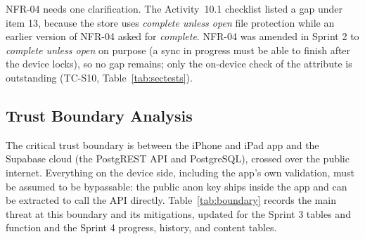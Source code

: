 \documentclass[12pt,letterpaper]{article}
\begin{document}
NFR-04 needs one clarification. The Activity~10.1 checklist listed a gap under item
13, because the store uses \emph{complete unless open} file protection while an
earlier version of NFR-04 asked for \emph{complete}. NFR-04 was amended in Sprint 2 to
\emph{complete unless open} on purpose (a sync in progress must be able to finish after
the device locks), so no gap remains; only the on-device check of the attribute is
outstanding (TC-S10, Table~\ref{tab:sectests}).

\subsection{Trust Boundary Analysis}
The critical trust boundary is between the iPhone and iPad app and the Supabase cloud (the
PostgREST API and PostgreSQL), crossed over the public internet. Everything on the
device side, including the app's own validation, must be assumed to be bypassable:
the public anon key ships inside the app and can be extracted to call the API
directly. Table~\ref{tab:boundary} records the main threat at this boundary and its
mitigations, updated for the Sprint 3 tables and function and the Sprint 4 progress,
history, and content tables.
\end{document}
